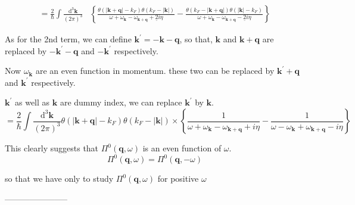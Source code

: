 \[\begin{split}=\frac{2}{\hbar} \int \frac{\mathrm{d}^3 \mathbf{k}}{(2\pi)^3}
 &\left\{  \frac{\theta(|\mathbf{k}+\mathbf{q}|-k_F)\theta(k_F - |\mathbf{k}|)}{\omega + \omega_{\mathbf{k}}- \omega_{\mathbf{k}+\mathbf{q}} +\underline{2}i \eta} - \frac{\theta(k_F - |\mathbf{k}+\mathbf{q}|) \theta(|\mathbf{k}|-k_F)}{\omega + \omega_{\mathbf{k}} - \omega_{\mathbf{k}+\mathbf{q}}-\underline{2}i \eta} \right\} 
 \end{split}\]

As for the 2nd term, we can define $\mathbf{k}^{'} = -\mathbf{k}-\mathbf{q}$, so that, $\mathbf{k}$ and $\mathbf{k} + \mathbf{q}$ are replaced by $-\mathbf{k}^{'}-\mathbf{q}$ and $-\mathbf{k}^{'}$ respectively.

Now $\omega_\mathbf{k}$ are an even function in momentum. these two can be replaced by $\mathbf{k}^{'} + \mathbf{q}$ and $\mathbf{k}^{'}$ respectively.

$\mathbf{k}^{'}$ as well as $\mathbf{k}$ are dummy index, we can replace $\mathbf{k}^{'}$ by $\mathbf{k}$.
\[=\frac{2}{\hbar} \int \frac{\mathrm{d}^3 \mathbf{k}}{(2\pi)^3}\theta(|\mathbf{k}+\mathbf{q}|-k_F)\theta(k_F - |\mathbf{k}|) \times \left\{ \frac{1}{\omega+\omega_{\mathbf{k}}- \omega_{\mathbf{k}+\mathbf{q}}+i \eta} - \frac{1}{\omega-\omega_{\mathbf{k}}+ \omega_{\mathbf{k}+\mathbf{q}}-i \eta} \right\}\]

This clearly suggests that $\Pi^0(\mathbf{q},\omega)$ is an even function of $\omega$.
\begin{equation} \label{Eqs2.8.14} \Pi^0(\mathbf{q},\omega) = \Pi^0(\mathbf{q},-\omega)\end{equation}

so that we have only to study $\Pi^0(\mathbf{q},\omega)$ for positive $\omega$
\begin{center}-----------------------\end{center}

